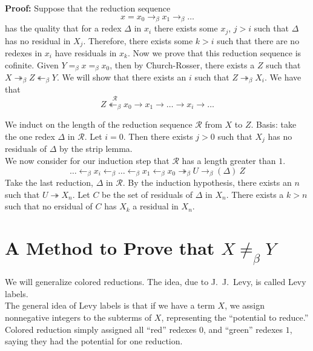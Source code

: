 \textbf{Proof:} Suppose that the reduction sequence
\begin{equation*}
  x = x_0 \rightarrow_\beta x_1 \rightarrow_\beta \ldots
\end{equation*}
has the quality that for a redex $\Delta$ in $x_i$ there exists some $x_j$, $j > i$ such that $\Delta$ has no residual in $X_j$. Therefore, there exists some $k > i$ such that there are no redexes in $x_i$ have residuals in $x_k$. Now we prove that this reduction sequence is cofinite. Given $Y =_\beta x =_\beta x_0$, then by Church-Rosser, there exists a $Z$ such that $X \twoheadrightarrow_\beta Z \twoheadleftarrow_\beta Y$. We will show that there exists an $i$ such that $Z \twoheadrightarrow_\beta X_i$. We have that
\begin{equation*}
  Z \stackrel{\mathscr{R}}{\twoheadleftarrow_\beta} x_0 \rightarrow x_1 \rightarrow \ldots \rightarrow x_i \rightarrow \ldots
\end{equation*}

We induct on the length of the reduction sequence $\mathscr{R}$ from $X$ to $Z$. Basis: take the one redex $\Delta$ in $\mathscr{R}$. Let $i = 0$. Then there exists $j > 0$ such that $X_j$ has no residuals of $\Delta$ by the strip lemma.\\

We now consider for our induction step that $\mathscr{R}$ has a length greater than $1$.
\begin{equation*}
  \ldots \leftarrow_\beta x_i \leftarrow_\beta \ldots \leftarrow_\beta x_1 \leftarrow_\beta x_0 \twoheadrightarrow_\beta U \rightarrow_\beta(\Delta)\ Z
\end{equation*}
Take the last reduction, $\Delta$ in $\mathscr{R}$. By the induction hypothesis, there exists an $n$ such that $U \twoheadrightarrow X_n$. Let $C$ be the set of residuals of $\Delta$ in $X_n$. There exists a $k > n$ such that no ersidual of $C$ has $X_k$ a residual in $X_n$.\\

\section{A Method to Prove that $X \not=_\beta Y$}
We will generalize colored reductions. The idea, due to J.~J.~Levy, is called Levy labels.\\

The general idea of Levy labels is that if we have a term $X$, we assign nonnegative integers to the subterms of $X$, representing the ``potential to reduce.'' Colored reduction simply assigned all ``red'' redexes $0$, and ``green'' redexes $1$, saying they had the potential for one reduction.\\

